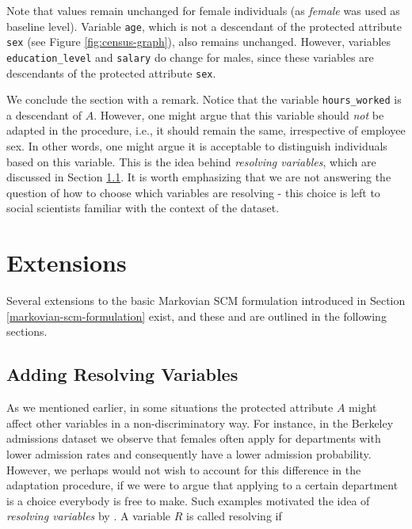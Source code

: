 \documentclass[
  nojss]{jss}
\begin{document}
Note that values remain unchanged for female individuals (as
\emph{female} was used as baseline level). Variable \texttt{age}, which
is not a descendant of the protected attribute \texttt{sex} (see Figure
\ref{fig:census-graph}), also remains unchanged. However, variables
\texttt{education\_level} and \texttt{salary} do change for males, since
these variables are descendants of the protected attribute \texttt{sex}.

We conclude the section with a remark. Notice that the variable
\texttt{hours\_worked} is a descendant of \(A\). However, one might
argue that this variable should \emph{not} be adapted in the procedure,
i.e., it should remain the same, irrespective of employee sex. In other
words, one might argue it is acceptable to distinguish individuals based
on this variable. This is the idea behind \emph{resolving variables},
which are discussed in Section \ref{sec:resolvers}. It is worth
emphasizing that we are not answering the question of how to choose
which variables are resolving - this choice is left to social scientists
familiar with the context of the dataset.

\hypertarget{sec:extensions}{%
\section{Extensions}\label{sec:extensions}}

Several extensions to the basic Markovian SCM formulation introduced in
Section \ref{markovian-scm-formulation} exist, and these and are
outlined in the following sections.

\hypertarget{sec:resolvers}{%
\subsection{Adding Resolving Variables}\label{sec:resolvers}}

As we mentioned earlier, in some situations the protected attribute
\(A\) might affect other variables in a non-discriminatory way. For
instance, in the Berkeley admissions dataset \citep{bickel1975sex} we
observe that females often apply for departments with lower admission
rates and consequently have a lower admission probability. However, we
perhaps would not wish to account for this difference in the adaptation
procedure, if we were to argue that applying to a certain department is
a choice everybody is free to make. Such examples motivated the idea of
\emph{resolving variables} by \citet{kilbertus2017avoiding}. A variable
\(R\) is called resolving if
\end{document}
